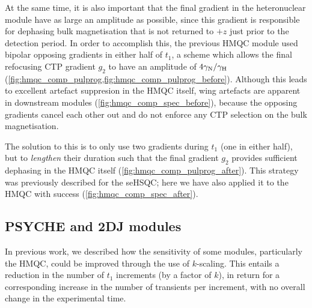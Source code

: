 \documentclass[a4paper,11pt]{article}
\newcommand{\nitrogen}{\ce{^{15}N}}
\begin{document}
At the same time, it is also important that the final gradient in the heteronuclear module have as large an amplitude as possible, since this gradient is responsible for dephasing bulk magnetisation that is not returned to $+z$ just prior to the detection period.
In order to accomplish this, the previous \nitrogen{} HMQC module used bipolar opposing gradients in either half of $t_1$, a scheme which allows the final refocusing CTP gradient $g_2$ to have an amplitude of $4\gamma_{\ce{N}} / \gamma_{\ce{H}}$ (\cref{fig:hmqc_comp_pulprog,fig:hmqc_comp_pulprog_before}).
Although this leads to excellent artefact suppresion in the \nitrogen{} HMQC itself, wing artefacts are apparent in downstream modules (\cref{fig:hmqc_comp_spec_before}), because the opposing gradients cancel each other out and do not enforce any CTP selection on the bulk magnetisation.

The solution to this is to only use two gradients during $t_1$ (one in either half), but to \textit{lengthen} their duration such that the final gradient $g_2$ provides sufficient dephasing in the HMQC itself (\cref{fig:hmqc_comp_pulprog_after}).
This strategy was previously described for the \nitrogen{} seHSQC;\autocite{Yong2021JMR} here we have also applied it to the HMQC with success (\cref{fig:hmqc_comp_spec_after}).

\subsection{PSYCHE and 2DJ modules}

In previous work,\autocite{Yong2021JMR} we described how the sensitivity of some \nitrogen{} modules, particularly the HMQC, could be improved through the use of $k$-scaling.\autocite{PerezTrujillo2007MRC}
This entails a reduction in the number of $t_1$ increments (by a factor of $k$), in return for a corresponding increase in the number of transients per increment, with no overall change in the experimental time.
\end{document}
